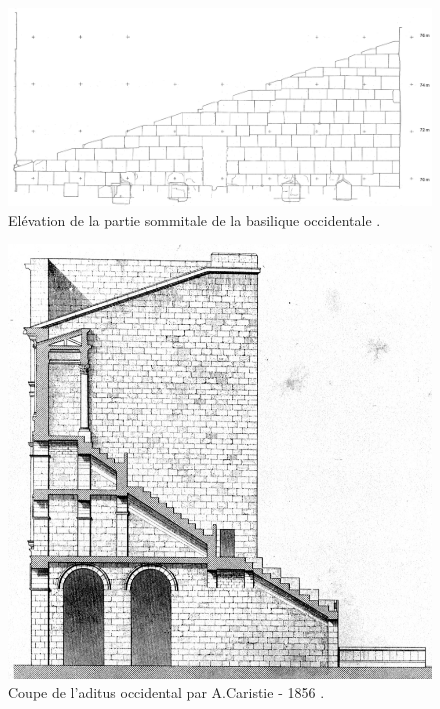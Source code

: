 \begin{figure}[!h]
	\includegraphics[width=\linewidth]{images/grenierOcci}
	\caption[Elévation de la partie sommitale de la basilique occidentale.]{Elévation de la partie sommitale de la basilique occidentale \cite[Pl. XLVI]{orangePl}.}
	\label{grenier} 
\end{figure} 

\begin{figure}[!h]
	\includegraphics[width=\linewidth]{images/colonneCaristie}
	\caption[Coupe de l'\gls{aditus} occidental par A.Caristie - 1856.]{Coupe de l'\gls{aditus} occidental par A.Caristie - 1856 \cite[Pl. VI]{orangePl}.}
	\label{colonneCaristie} 
\end{figure}

